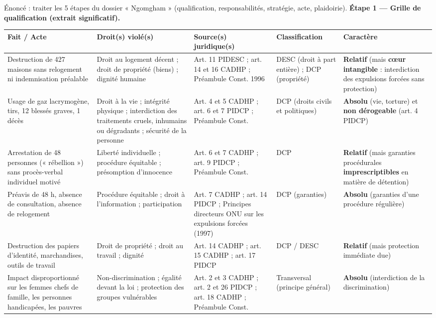 \documentclass[11pt]{article}
\newcounter{popsec}
\newcounter{popsub}
\newcommand{\courssub}[1]{%
  \stepcounter{popsub}%
  \par\vspace{9pt}\noindent{\popxbold\fontsize{11.5}{13}\selectfont\color{popink}{\color{poporange}\thepopsec.\thepopsub}\hspace{6pt}#1}\par\nopagebreak\vspace{4pt}
}
\begin{document}
\courssub{Démarche et corrigé commenté}
\begin{exoresolu}
Énoncé : traiter les 5 étapes du dossier « Ngomgham » (qualification, responsabilités, stratégie, acte, plaidoirie).
\tcblower
\textbf{Étape 1 — Grille de qualification (extrait significatif).}

\begin{center}
\begin{tabularx}{\linewidth}{|l|X|X|X|X|}\hline
\textbf{Fait / Acte} & \textbf{Droit(s) violé(s)} & \textbf{Source(s) juridique(s)} & \textbf{Classification} & \textbf{Caractère} \\ \hline
Destruction de 427 maisons sans relogement ni indemnisation préalable & Droit au logement décent ; droit de propriété (biens) ; dignité humaine & Art. 11 PIDESC ; art. 14 et 16 CADHP ; Préambule Const. 1996 & DESC (droit à part entière) ; DCP (propriété) & \textbf{Relatif} (mais \textbf{cœur intangible} : interdiction des expulsions forcées sans protection) \\ \hline
Usage de gaz lacrymogène, tirs, 12 blessés graves, 1 décès & Droit à la vie ; intégrité physique ; interdiction des traitements cruels, inhumains ou dégradants ; sécurité de la personne & Art. 4 et 5 CADHP ; art. 6 et 7 PIDCP ; Préambule Const. & DCP (droits civils et politiques) & \textbf{Absolu} (vie, torture) et \textbf{non dérogeable} (art. 4 PIDCP) \\ \hline
Arrestation de 48 personnes (« rébellion ») sans procès-verbal individuel motivé & Liberté individuelle ; procédure équitable ; présomption d'innocence & Art. 6 et 7 CADHP ; art. 9 PIDCP ; Préambule Const. & DCP & \textbf{Relatif} (mais garanties procédurales \textbf{imprescriptibles} en matière de détention) \\ \hline
Préavis de 48 h, absence de consultation, absence de relogement & Procédure équitable ; droit à l'information ; participation & Art. 7 CADHP ; art. 14 PIDCP ; Principes directeurs ONU sur les expulsions forcées (1997) & DCP (garanties) & \textbf{Absolu} (garanties d'une procédure régulière) \\ \hline
Destruction des papiers d'identité, marchandises, outils de travail & Droit de propriété ; droit au travail ; dignité & Art. 14 CADHP ; art. 15 CADHP ; art. 17 PIDCP & DCP / DESC & \textbf{Relatif} (mais protection immédiate due) \\ \hline
Impact disproportionné sur les femmes chefs de famille, les personnes handicapées, les pauvres & Non-discrimination ; égalité devant la loi ; protection des groupes vulnérables & Art. 2 et 3 CADHP ; art. 2 et 26 PIDCP ; art. 18 CADHP ; Préambule Const. & Transversal (principe général) & \textbf{Absolu} (interdiction de la discrimination) \\ \hline
\end{tabularx}
\end{center}


\end{exoresolu}
\end{document}

